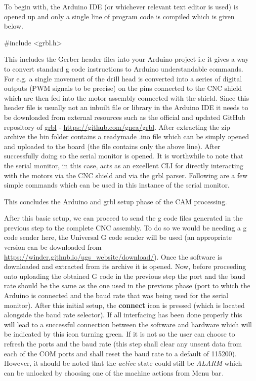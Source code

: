 To begin with, the Arduino IDE (or whichever relevant text editor is used) is opened up and only a single line of program code is compiled which is given below.

 {\selectfont \#include <grbl.h>}

This includes the Gerber header files into your Arduino project i.e it gives a way to convert standard g code instructions to Arduino understandable commands. For e.g. a single movement of the drill head is converted into a series of digital outputs (PWM signals to be precise) on the pins connected to the CNC shield which are then fed into the motor assembly connected with the shield. Since this header file is usually not an inbuilt file or library in the Arduino IDE it needs to be downloaded from external resources such as the official and updated GitHub repository of \href{https://github.com/gnea/grbl}{grbl} - \url{https://github.com/gnea/grbl}. After extracting the zip archive the bin folder contains a readymade .ino file which can be simply opened and uploaded to the board (the file contains only the above line). After successfully doing so the serial monitor is opened. It is worthwhile to note that the serial monitor, in this case, acts as an excellent CLI for directly interacting with the motors via the CNC shield and via the grbl parser. Following are a few simple commands which can be used in this instance of the serial monitor. \par


This concludes the Arduino and grbl setup phase of the CAM processing.

After this basic setup, we can proceed to send the g code files generated in the previous step to the complete CNC assembly. To do so we would be needing a g code sender here, the Universal G code sender will be used (an appropriate version can be downloaded from \url{https://winder.github.io/ugs_website/download/}). Once the software is downloaded and extracted from its archive it is opened. Now, before proceeding onto uploading the obtained G code in the previous step the port and the baud rate should be the same as the one used in the previous phase (port to which the Arduino is connected and the baud rate that was being used for the serial monitor). After this initial setup, the \textbf{connect} icon is pressed (which is located alongside the baud rate selector). If all interfacing has been done properly this will lead to a successful connection between the software and hardware which will be indicated by this icon turning green. If it is not so the user can choose to refresh the ports and the baud rate (this step shall clear any unsent data from each of the COM ports and shall reset the baud rate to a default of 115200). However, it should be noted that the \textit{active} state could still be \textit{ALARM} which can be unlocked by choosing one of the machine actions from Menu bar. \par

